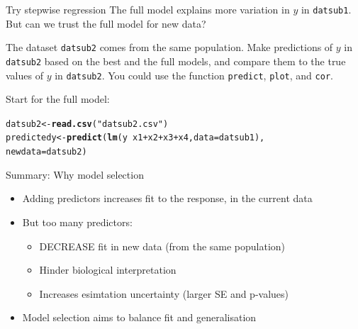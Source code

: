 \documentclass[10pt]{beamer}\usepackage[]{graphicx}\usepackage[]{color}
\makeatletter
\newcommand{\hlstr}[1]{\textcolor[rgb]{0.192,0.494,0.8}{#1}}%
\newcommand{\hlopt}[1]{\textcolor[rgb]{0,0,0}{#1}}%
\newcommand{\hlstd}[1]{\textcolor[rgb]{0.345,0.345,0.345}{#1}}%
\newcommand{\hlkwb}[1]{\textcolor[rgb]{0.69,0.353,0.396}{#1}}%
\newcommand{\hlkwc}[1]{\textcolor[rgb]{0.333,0.667,0.333}{#1}}%
\newcommand{\hlkwd}[1]{\textcolor[rgb]{0.737,0.353,0.396}{\textbf{#1}}}%
\newenvironment{kframe}{%
 \def\at@end@of@kframe{}%
 \ifinner\ifhmode%
  \def\at@end@of@kframe{\end{minipage}}%
  \begin{minipage}{\columnwidth}%
 \fi\fi%
 \def\FrameCommand##1{\hskip\@totalleftmargin \hskip-\fboxsep
 \colorbox{shadecolor}{##1}\hskip-\fboxsep
     \hskip-\linewidth \hskip-\@totalleftmargin \hskip\columnwidth}%
 \MakeFramed {\advance\hsize-\width
   \@totalleftmargin\z@ \linewidth\hsize
   \@setminipage}}%
 {\par\unskip\endMakeFramed%
 \at@end@of@kframe}
\newenvironment{knitrout}{}{} %
\makeatother
\begin{document}
\begin{frame}[fragile]{Try stepwise regression}
The full model explains more variation in $y$ in \texttt{datsub1}. But can we trust the full model for new data?
\pause

The dataset \texttt{datsub2} comes from the same population. Make predictions of $y$ in \texttt{datsub2} based on the best and the full models, and compare them to the true values of $y$ in \texttt{datsub2}. You could use the function \texttt{predict}, \texttt{plot}, and \texttt{cor}.

Start for the full model:
\begin{knitrout}\small
{}\color{fgcolor}\begin{kframe}
\begin{alltt}
\hlstd{datsub2} \hlkwb{<-} \hlkwd{read.csv}\hlstd{(}\hlstr{"datsub2.csv"}\hlstd{)}
\hlstd{predictedy} \hlkwb{<-} \hlkwd{predict}\hlstd{(}\hlkwd{lm}\hlstd{(y} \hlopt{~} \hlstd{x1} \hlopt{+} \hlstd{x2} \hlopt{+} \hlstd{x3} \hlopt{+} \hlstd{x4,} \hlkwc{data} \hlstd{= datsub1),}
                      \hlkwc{newdata} \hlstd{= datsub2)}
\end{alltt}
\end{kframe}
\end{knitrout}



\end{frame}

\begin{frame}{Summary: Why model selection}

  \begin{exampleblock}{}
    \begin{itemize}
      \item Adding predictors increases fit to the response, in the current data
      \item But too many predictors:
        \begin{itemize}
          \item DECREASE fit in new data (from the same population)
          \item Hinder biological interpretation
          \item Increases esimtation uncertainty (larger SE and p-values)
        \end{itemize}
      \item Model selection aims to balance fit and generalisation 
    \end{itemize}
  \end{exampleblock}
\end{frame}
\end{document}

